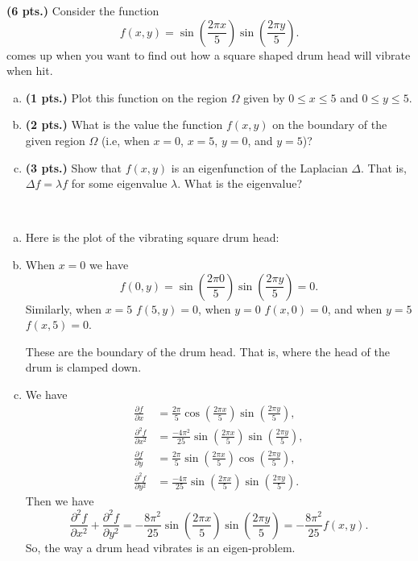 \documentclass[12pt]{article} %
\begin{document}
\begin{problem}
\textbf{(6 pts.)} Consider the function
\[
f(x,y)=\sin\left(\frac{2\pi x}{5}\right)\sin\left(\frac{2\pi y}{5}\right).
\]
comes up when you want to find out how a square shaped drum head will vibrate when hit.
\begin{enumerate}[(a)]
    \item \textbf{(1 pts.)} Plot this function on the region $\Omega$ given by $0\leq x \leq 5$ and $0\leq y \leq 5$.
    \item \textbf{(2 pts.)} What is the value the function $f(x,y)$ on the boundary of the given region $\Omega$ (i.e, when $x=0$, $x=5$, $y=0$, and $y=5$)?
    \item \textbf{(3 pts.)} Show that $f(x,y)$ is an eigenfunction of the Laplacian $\Delta$. That is, $\Delta f = \lambda f$ for some eigenvalue $\lambda$. What is the eigenvalue?
\end{enumerate}
\end{problem}
\begin{solution}~
\begin{enumerate}[(a)]
    \item Here is the plot of the vibrating square drum head:
    \begin{figure}[H]
        \centering
	\def\svgwidth{0.75\columnwidth}
	
    \end{figure}
    \item When $x=0$ we have
    \[
    f(0,y) = \sin\left( \frac{2\pi 0}{5}\right) \sin\left(\frac{2\pi y}{5}\right) = 0.
    \]
    Similarly, when $x=5$ $f(5,y)=0$, when $y=0$ $f(x,0)=0$, and when $y=5$ $f(x,5)=0$.

    These are the boundary of the drum head.  That is, where the head of the drum is clamped down.

    \item We have
    \begin{align*}
        \frac{\partial f}{\partial x} &= \frac{2\pi}{5} \cos \left( \frac{2\pi x}{5} \right) \sin \left( \frac{2\pi y}{5} \right),\\
        \frac{\partial^2 f}{\partial x^2} &= \frac{-4\pi^2}{25} \sin \left( \frac{2\pi x}{5} \right) \sin \left( \frac{2\pi y}{5} \right),\\
        \frac{\partial f}{\partial y} &= \frac{2\pi}{5} \sin \left( \frac{2\pi x}{5} \right) \cos \left( \frac{2\pi y}{5} \right),\\
        \frac{\partial^2 f}{\partial y^2} &= \frac{-4\pi}{25} \sin \left( \frac{2\pi x}{5} \right) \sin \left( \frac{2\pi y}{5} \right).
    \end{align*}
    Then we have
    \[
    \frac{\partial^2 f}{\partial x^2} + \frac{\partial^2 f}{\partial y^2} = -\frac{8\pi^2}{25} \sin \left( \frac{2\pi x}{5} \right) \sin \left( \frac{2\pi y}{5} \right) = -\frac{8\pi^2}{25} f(x,y).
    \]
    So, the way a drum head vibrates is an eigen-problem.
\end{enumerate}
\end{solution}
\end{document}
